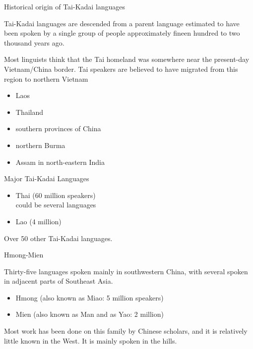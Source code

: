 \documentclass{beamer}
\begin{document}
\begin{frame}{Historical origin of Tai-Kadai languages}


Tai-Kadai languages are descended from a parent language estimated to
have been spoken by a single group of people approximately fineen
hundred to two thousand years ago.

Most linguists think that the Tai homeland was somewhere near the
present-day Vietnam/China border. Tai speakers are believed to have migrated from this region to northern
Vietnam

  \begin{itemize}
\item Laos
\item Thailand
\item southern provinces of China

\item northern Burma
\item Assam in north-eastern India
\end{itemize}
\end{frame}


\begin{frame}{Major Tai-Kadai Languages}
  \begin{itemize}
  \item Thai (60 million speakers)
    \\ could be several languages
  \item Lao (4 million)
  \end{itemize}

Over 50 other Tai-Kadai languages.
\end{frame}

\begin{frame}{Hmong-Mien}

  Thirty-ﬁve languages spoken mainly in southwestern
  China, with several spoken in adjacent parts of Southeast Asia.

  \begin{itemize}
  \item Hmong (also known as Miao: 5 million speakers)
  \item Mien (also known as Man and as Yao: 2 million)
  \end{itemize}

Most work has been done on this family by Chinese scholars, and it is
relatively little known in the West.   It is mainly spoken in the hills.
  
\end{frame}
\end{document}
